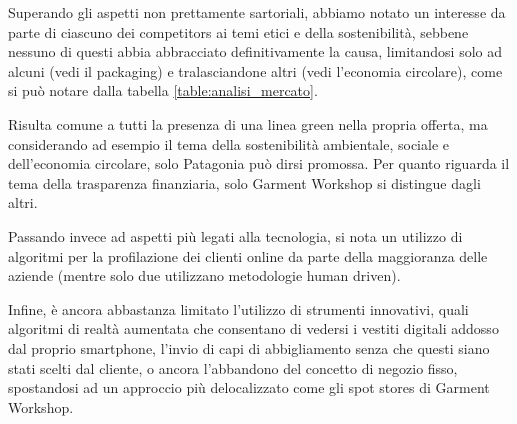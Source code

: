 \documentclass[12pt]{article}
\begin{document}
Superando gli aspetti non prettamente sartoriali, abbiamo notato un interesse da parte di ciascuno dei competitors ai temi etici e della sostenibilità, sebbene nessuno di questi abbia abbracciato definitivamente la causa, limitandosi solo ad alcuni (vedi il packaging) e tralasciandone altri (vedi l'economia circolare), come si può notare dalla tabella \ref{table:analisi_mercato}.

Risulta comune a tutti la presenza di una linea green nella propria offerta, ma considerando ad esempio il tema della sostenibilità ambientale, sociale e dell'economia circolare, solo Patagonia può dirsi promossa. Per quanto riguarda il tema della trasparenza finanziaria, solo Garment Workshop si distingue dagli altri.

Passando invece ad aspetti più legati alla tecnologia, si nota un utilizzo di algoritmi per la profilazione dei clienti online da parte della maggioranza delle aziende (mentre solo due utilizzano metodologie human driven).

Infine, è ancora abbastanza limitato l'utilizzo di strumenti innovativi, quali algoritmi di realtà aumentata che consentano di vedersi i vestiti digitali addosso dal proprio smartphone, l'invio di capi di abbigliamento senza che questi siano stati scelti dal cliente, o ancora l'abbandono del concetto di negozio fisso,  spostandosi ad un approccio più delocalizzato come gli spot stores di Garment Workshop.
\end{document}
